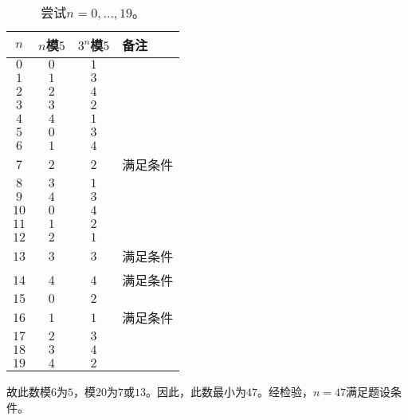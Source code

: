 \begin{table}[hbp]
  \centering
  \begin{tabular}{cccl}
    \toprule
    $n$ & $n$模$5$ & $3^n$模$5$ & 备注 \\
    \midrule
    $0$ & $0$ & $1$ & \\
    $1$ & $1$ & $3$ & \\
    $2$ & $2$ & $4$ & \\
    $3$ & $3$ & $2$ & \\
    $4$ & $4$ & $1$ & \\
    $5$ & $0$ & $3$ & \\
    $6$ & $1$ & $4$ & \\
    $7$ & $2$ & $2$ & 满足条件 \\
    $8$ & $3$ & $1$ & \\
    $9$ & $4$ & $3$ & \\
    $10$ & $0$ & $4$ & \\
    $11$ & $1$ & $2$ & \\
    $12$ & $2$ & $1$ & \\
    $13$ & $3$ & $3$ & 满足条件 \\
    $14$ & $4$ & $4$ & 满足条件 \\
    $15$ & $0$ & $2$ & \\
    $16$ & $1$ & $1$ & 满足条件 \\
    $17$ & $2$ & $3$ & \\
    $18$ & $3$ & $4$ & \\
    $19$ & $4$ & $2$ & \\
    \bottomrule
  \end{tabular}
  \caption{尝试$n = 0, \dots, 19$。} \label{tab:006B-mod-5}
\end{table}

故此数模$6$为$5$，模$20$为$7$或$13$。因此，此数最小为$47$。经检验，$n = 47$满足题设条件。
